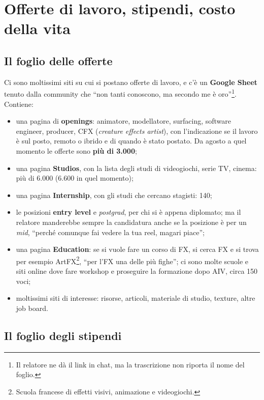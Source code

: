 \section{Offerte di lavoro, stipendi, costo della vita}
\label{p4:sec:stipendi}

\subsection{Il foglio delle offerte}

Ci sono moltissimi siti su cui si postano offerte di lavoro, e c'è un
\textbf{Google Sheet} tenuto dalla community che ``non tanti conoscono, ma
secondo me è oro''\footnote{Il relatore ne dà il link in chat, ma la
trascrizione non riporta il nome del foglio.}. Contiene:
\begin{itemize}
  \item una pagina di \textbf{openings}: animatore, modellatore, surfacing,
        software engineer, producer, CFX (\emph{creature effects artist}),
        con l'indicazione se il lavoro è sul posto, remoto o ibrido e di
        quando è stato postato. Da agosto a quel momento le offerte sono
        \textbf{più di 3.000};
  \item una pagina \textbf{Studios}, con la lista degli studi di
        videogiochi, serie TV, cinema: più di 6.000 (6.600 in quel momento);
  \item una pagina \textbf{Internship}, con gli studi che cercano stagisti:
        140;
  \item le posizioni \textbf{entry level} e \emph{postgrad}, per chi si è
        appena diplomato; ma il relatore manderebbe sempre la candidatura
        anche se la posizione è per un \emph{mid}, ``perché comunque fai
        vedere la tua reel, magari piace'';
  \item una pagina \textbf{Education}: se si vuole fare un corso di FX, si
        cerca FX e si trova per esempio ArtFX\footnote{Scuola francese di
        effetti visivi, animazione e videogiochi.}, ``per l'FX una delle più
        fighe''; ci sono molte scuole e siti online dove fare workshop e
        proseguire la formazione dopo AIV, circa 150 voci;
  \item moltissimi siti di interesse: risorse, articoli, materiale di studio,
        texture, altre job board.
\end{itemize}

\subsection{Il foglio degli stipendi}

